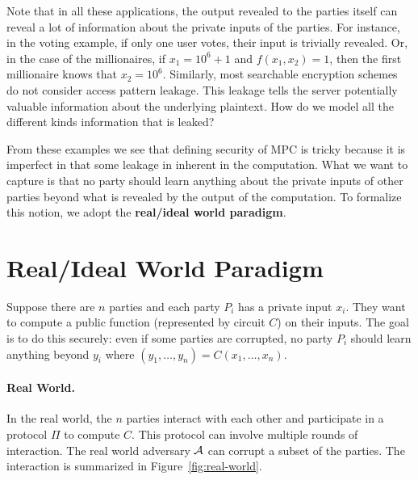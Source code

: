 Note that in all these applications, the output revealed to the parties itself can reveal a lot of information about the private inputs of the parties.
For instance, in the voting example, if only one user votes, their input is trivially revealed.
Or, in the case of the millionaires, if $x_1 = 10^6 + 1$ and $f(x_1, x_2) = 1$, then the first millionaire knows that $x_2 = 10^6$.
Similarly, most searchable encryption schemes do not consider access pattern leakage. This leakage tells the server potentially valuable information about the underlying plaintext.
How do we model all the different kinds information that is leaked?

From these examples we see that defining security of MPC is tricky because it is imperfect in that some leakage in inherent in the computation.
What we want to capture is that no party should learn anything about the private inputs of other parties beyond what is revealed by the output of the computation.
To formalize this notion, we adopt the \textbf{real/ideal world paradigm}.



\section{Real/Ideal World Paradigm}
Suppose there are $n$ parties and each party $P_i$ has a private input $x_i$.
They want to compute a public function (represented by circuit $C$) on their inputs.
The goal is to do this securely: even if some parties are corrupted, no party $P_i$ should learn anything beyond $y_i$ where $(y_1, \ldots, y_n) = C(x_1, \ldots, x_n)$.

\paragraph{Real World.} In the real world, the $n$ parties interact with each other and participate in a protocol $\Pi$
to compute $C$.
This protocol can involve multiple rounds of interaction.
The real world adversary $\mathcal{A}$ can corrupt a subset of the parties.
The interaction is summarized in Figure~\ref{fig:real-world}.

